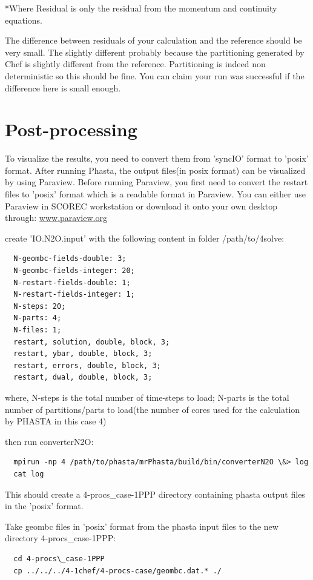 \documentclass{article}
\begin{document}
*Where Residual is only the residual from the momentum and continuity equations.

The difference between residuals of your calculation and the reference should be very small. The slightly different probably because the partitioning generated by Chef is slightly different from the reference. Partitioning is indeed non deterministic so this should be fine. You can claim your run was successful if the difference here is small enough.

\section{Post-processing}

To visualize the results, you need to convert them from 'syncIO' format to 'posix' format. After running Phasta, the output files(in posix format) can be visualized by using Paraview. Before running Paraview, you first need to convert the restart files to 'posix' format which is a readable format in Paraview. You can either use Paraview in SCOREC workstation or download it onto your own desktop through:
\url{www.paraview.org}

create 'IO.N2O.input' with the following content in folder /path/to/4solve:
   \begin{lstlisting}
  N-geombc-fields-double: 3;
  N-geombc-fields-integer: 20;
  N-restart-fields-double: 1;
  N-restart-fields-integer: 1;
  N-steps: 20;
  N-parts: 4;
  N-files: 1;
  restart, solution, double, block, 3;
  restart, ybar, double, block, 3;
  restart, errors, double, block, 3;
  restart, dwal, double, block, 3;
    \end{lstlisting}

where, N-steps is the total number of time-steps to load; N-parts is the total number of partitions/parts to load(the number of cores used for the calculation by PHASTA in this case 4)

then run converterN2O:
  \begin{lstlisting}
  mpirun -np 4 /path/to/phasta/mrPhasta/build/bin/converterN2O \&> log
  cat log
    \end{lstlisting}

This should create a 4-procs\_case-1PPP directory containing phasta output files in the 'posix' format.

Take geombc files in 'posix' format from the phasta input files to the new directory 4-procs\_case-1PPP:

  \begin{lstlisting}
  cd 4-procs\_case-1PPP
  cp ../../../4-1chef/4-procs-case/geombc.dat.* ./
    \end{lstlisting}
\end{document}
